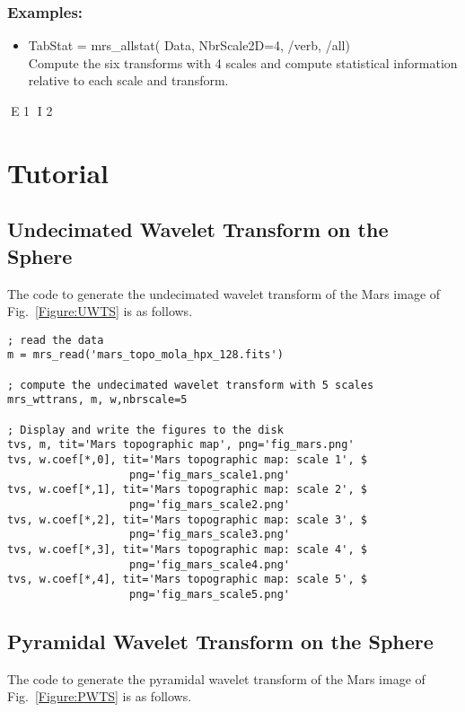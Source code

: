 \subsubsection*{Examples:} 
\begin{itemize}
\item TabStat = mrs\_allstat( Data, NbrScale2D=4, /verb, /all)  \\
Compute the six transforms with 4 scales and compute statistical information relative to each scale and transform.
\end{itemize}

E 1
I 2




\section{Tutorial}

\subsection{Undecimated Wavelet Transform on the Sphere}
The code to generate the undecimated wavelet transform of the Mars 
image of Fig.~\ref{Figure:UWTS} is as follows. 
\begin{verbatim}
; read the data 
m = mrs_read('mars_topo_mola_hpx_128.fits')

; compute the undecimated wavelet transform with 5 scales
mrs_wttrans, m, w,nbrscale=5

; Display and write the figures to the disk
tvs, m, tit='Mars topographic map', png='fig_mars.png'
tvs, w.coef[*,0], tit='Mars topographic map: scale 1', $
                   png='fig_mars_scale1.png' 
tvs, w.coef[*,1], tit='Mars topographic map: scale 2', $
                   png='fig_mars_scale2.png'
tvs, w.coef[*,2], tit='Mars topographic map: scale 3', $
                   png='fig_mars_scale3.png'
tvs, w.coef[*,3], tit='Mars topographic map: scale 4', $
                   png='fig_mars_scale4.png'
tvs, w.coef[*,4], tit='Mars topographic map: scale 5', $
                   png='fig_mars_scale5.png'
\end{verbatim}

\subsection{Pyramidal Wavelet Transform on the Sphere}
The code to generate the pyramidal wavelet transform of the Mars 
image of Fig.~\ref{Figure:PWTS} is as follows.  

